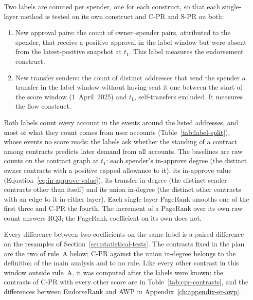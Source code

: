 Two labels are counted per spender, one for each construct, so that each single-layer method is tested on its own construct and \mbox{C-PR} and \mbox{S-PR} on both:
\begin{enumerate}
\item New approval pairs: the count of owner--spender pairs, attributed to the spender, that receive a positive approval in the label window but were absent from the latest-positive snapshot at $t_1$. This label measures the endorsement construct.
\item New transfer senders: the count of distinct addresses that send the spender a transfer in the label window without having sent it one between the start of the score window (1~April~2025) and $t_1$, self-transfers excluded. It measures the flow construct.
\end{enumerate}
Both labels count every account in the events around the listed addresses, and most of what they count comes from user accounts (Table~\ref{tab:label-split}), whose events no score reads: the labels ask whether the standing of a contract among contracts predicts later demand from all accounts. The baselines are raw counts on the contract graph at $t_1$: each spender's in-approve degree (the distinct owner contracts with a positive capped allowance to it), its in-approve value (Equation~\eqref{eq:in-approve-value}), its transfer in-degree (the distinct sender contracts other than itself) and its union in-degree (the distinct other contracts with an edge to it in either layer). Each single-layer PageRank smooths one of the first three and \mbox{C-PR} the fourth. The increment of a PageRank over its own raw count answers RQ3; the PageRank coefficient on its own does not.

Every difference between two coefficients on the same label is a paired difference on the resamples of Section~\ref{sec:statistical-tests}. The contrasts fixed in the plan are the two of rule~A below; \mbox{C-PR} against the union in-degree belongs to the definition of the main analysis and to no rule. Like every other contrast in this window outside rule~A, it was computed after the labels were known; the contrasts of \mbox{C-PR} with every other score are in Table~\ref{tab:cpr-contrasts}, and the differences between EndorseRank and AWP in Appendix~\ref{ch:appendix-er-awp}.


